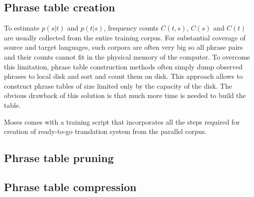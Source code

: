 \subsection{Phrase table creation}

To estimate $p(s|t)$ and $p(t|s)$, frequency counts $C(t,s)$, $C(s)$ and
$C(t)$ are usually collected from the entire training corpus.
For substantial coverage of source and target languages, such corpora are
often very big so all phrase pairs and their counts cannot fit in the
physical memory of the computer.
To overcome this limitation, phrase table construction methods often simply
dump observed phrases to local disk and sort and count them on disk.
This approach allows to construct phrase tables of size limited only by the
capacity of the disk.
The obvious drawback of this solution is that much more time is needed
to build the table.


Moses comes with a training script that incorporates all the steps required
for creation of ready-to-go translation system from the parallel corpus.

\subsection{Phrase table pruning}


\subsection{Phrase table compression}

